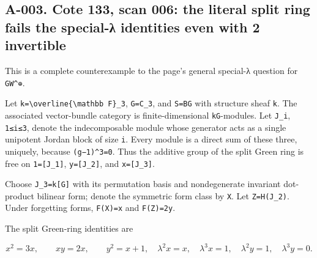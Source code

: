 \documentclass[
  10pt,
]{article}
\begin{document}
\subsection{A-003. Cote 133, scan 006: the literal split ring fails the
special-λ identities even with 2
invertible}\label{a-003.-cote-133-scan-006-the-literal-split-ring-fails-the-special-ux3bb-identities-even-with-2-invertible}

This is a complete counterexample to the page's general special-λ
question for \texttt{\small GW\textasciicircum{}⊕\allowbreak{}}.

Let
\texttt{\small k=\allowbreak{}\textbackslash{}overline\{\textbackslash{}mathbb F\}\_\allowbreak{}3},
\texttt{\small G=\allowbreak{}C\_\allowbreak{}3}, and
\texttt{\small S=\allowbreak{}BG} with structure sheaf
\texttt{\small k}. The associated vector-bundle category is
finite-dimensional \texttt{\small kG}-modules. Let
\texttt{\small J\_\allowbreak{}i},
\texttt{\small 1≤\allowbreak{}i≤\allowbreak{}3}, denote the
indecomposable module whose generator acts as a single unipotent Jordan
block of size \texttt{\small i}. Every module is a direct sum of these
three, uniquely, because
\texttt{\small (\allowbreak{}g−1)\allowbreak{}\textasciicircum{}3=\allowbreak{}0}.
Thus the additive group of the split Green ring is free on
\texttt{\small 1=\allowbreak{}[\allowbreak{}J\_\allowbreak{}1]\allowbreak{}},
\texttt{\small y=\allowbreak{}[\allowbreak{}J\_\allowbreak{}2]\allowbreak{}},
and
\texttt{\small x=\allowbreak{}[\allowbreak{}J\_\allowbreak{}3]\allowbreak{}}.

Choose
\texttt{\small J\_\allowbreak{}3=\allowbreak{}k[\allowbreak{}G]\allowbreak{}}
with its permutation basis and nondegenerate invariant dot-product
bilinear form; denote the symmetric form class by \texttt{\small X}. Let
\texttt{\small Z=\allowbreak{}H(\allowbreak{}J\_\allowbreak{}2)\allowbreak{}}.
Under forgetting forms,
\texttt{\small F(\allowbreak{}X)\allowbreak{}=\allowbreak{}x} and
\texttt{\small F(\allowbreak{}Z)\allowbreak{}=\allowbreak{}2y}.

The split Green-ring identities are

\[
x^2=3x,\qquad xy=2x,\qquad y^2=x+1,
\quad \lambda^2x=x,\quad\lambda^3x=1,
\quad\lambda^2y=1,\quad\lambda^3y=0.
\tag{A3.1}
\]
\end{document}
